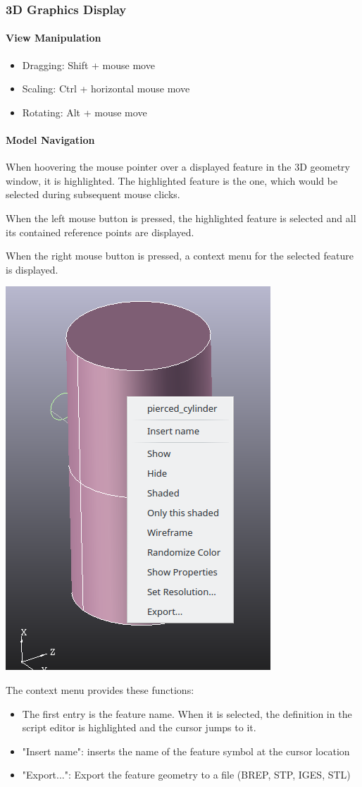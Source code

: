 \subsubsection{3D Graphics Display}

\paragraph{View Manipulation}

\begin{itemize}
\item Dragging: Shift + mouse move
\item Scaling: Ctrl + horizontal mouse move
\item Rotating: Alt + mouse move
\end{itemize}


\paragraph{Model Navigation}

When hoovering the mouse pointer over a displayed feature in the 3D
geometry window, it is highlighted. The highlighted feature is the one,
which would be selected during subsequent mouse clicks.

When the left mouse button is pressed, the highlighted feature is
selected and all its contained reference points are displayed.

When the right mouse button is pressed, a context menu for the selected
feature is displayed.

\includegraphics[width=0.33\linewidth]{figs/iscad/screen_iscad_contextmenu_3d}

The context menu provides these functions:

\begin{itemize}
\item The first entry is the feature name. When it is selected, the
    definition in the script editor is highlighted and the cursor jumps
    to it.
\item "Insert name": inserts the name of the feature symbol at the cursor
    location
\item "Export...": Export the feature geometry to a file (BREP, STP, IGES, STL)
\end{itemize}


